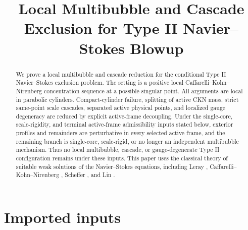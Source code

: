 \documentclass[11pt]{amsart}
\title[Local Multibubble Exclusion]{Local Multibubble and Cascade Exclusion for Type II Navier--Stokes Blowup}
\author{}
\date{}
\theoremstyle{plain}
\theoremstyle{definition}
\theoremstyle{remark}
\begin{document}
\begin{abstract}
We prove a local multibubble and cascade reduction for the conditional
Type II Navier--Stokes exclusion problem.  The setting is a positive local
Caffarelli--Kohn--Nirenberg concentration sequence at a possible singular
point.  All arguments are local in parabolic cylinders.  Compact-cylinder
failure, splitting of active CKN mass, strict same-point scale cascades,
separated active physical points, and localized gauge degeneracy are reduced by
explicit active-frame decoupling.  Under the single-core, scale-rigidity, and
terminal active-frame admissibility inputs stated below, exterior profiles and
remainders are perturbative in every selected active frame, and the remaining
branch is single-core, scale-rigid, or no longer an independent multibubble
mechanism.  Thus no local multibubble, cascade, or gauge-degenerate Type II
configuration remains under these inputs.
This paper uses the classical theory of suitable weak solutions of the
Navier--Stokes equations, including Leray \cite{Leray1934},
Caffarelli--Kohn--Nirenberg \cite{CaffarelliKohnNirenberg1982}, Scheffer
\cite{Scheffer1976}, and Lin \cite{Lin1998}.
\end{abstract}

\maketitle

\section*{Imported inputs}
\end{document}
